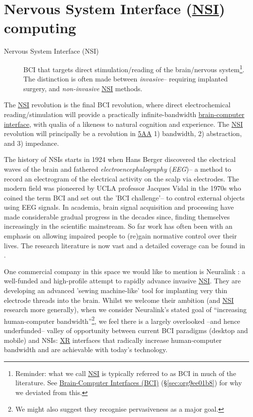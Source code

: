 \documentclass[logo,bsc,singlespacing,parskip]{infthesis}
\begin{document}
\section{Nervous System Interface (\hyperref[orgf403bf3]{NSI}) computing}
\label{sec:org4b6c5db}
\begin{mdframed}
\begin{description}
\item[{Nervous System Interface (\label{orgf403bf3}NSI)}] BCI that targets direct stimulation/reading of the brain/nervous system\footnote{Reminder: what we call \hyperref[orgf403bf3]{NSI} is typically referred to as BCI in much of the literature. See \hyperref[sec:org9ee01b8]{Brain-Computer Interfaces (BCI)} (\S \ref{sec:org9ee01b8}) for why we deviated from this.}.
The distinction is often made between \emph{invasive}-- requiring implanted surgery, and \emph{non-invasive} \hyperref[orgf403bf3]{NSI} methods.
\end{description}
\end{mdframed}

The \hyperref[orgf403bf3]{NSI} revolution is the final BCI revolution, where direct electrochemical reading/stimulation will provide a practically infinite-bandwidth \hyperref[org75a7ab5]{brain-computer interface}, with qualia of a likeness to natural cognition and experience.
The \hyperref[orgf403bf3]{NSI} revolution will principally be a revolution in \hyperref[org2644eb5]{5AA} 1) bandwidth, 2) abstraction, and 3) impedance.

The history of NSIs starts in 1924 when Hans Berger discovered the electrical waves of the brain and fathered \emph{electroencephalography} (\emph{EEG})--  a method to record an electrogram of the electrical activity on the scalp via electrodes.
The modern field was pioneered by UCLA professor Jacques Vidal in the 1970s who coined the term BCI and set out the 'BCI challenge'-- to control external objects using EEG signals.
In academia, brain signal acquisition and processing have made considerable gradual progress in the decades since, finding themselves increasingly in the scientific mainstream.
So far work has often been with an emphasis on allowing impaired people to (re)gain normative control over their lives.
The research literature is now vast and a detailed coverage can be found in \autocite{kawala-sterniukSummaryFiftyYears2021}.

One commercial company in this space we would like to mention is Neuralink \autocite{muskNeuralink}: a well-funded and high-profile attempt to rapidly advance invasive \hyperref[orgf403bf3]{NSI}.
They are developing an advanced 'sewing machine-like' tool for implanting very thin electrode threads into the brain.
Whilst we welcome their ambition (and \hyperref[orgf403bf3]{NSI} research more generally), when we consider Neuralink's stated goal of ``increasing human-computer bandwidth''\footnote{We might also suggest they recognise pervasiveness as a major goal.}, we feel there is a largely overlooked --and hence underfunded-- valley of opportunity between current BCI paradigms (desktop and mobile) and NSIs: \hyperref[org39cbd51]{XR} interfaces that radically increase human-computer bandwidth and are achievable with today's technology.
\end{document}
